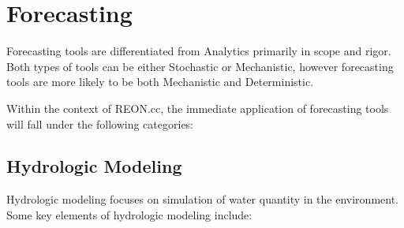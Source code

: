 \documentclass[letterpaper,12pt,english]{sphinxmanual}
\begin{document}
\section{Forecasting}
\label{\detokenize{requirements/knowledge/forecasting:forecasting}}\label{\detokenize{requirements/knowledge/forecasting::doc}}
\sphinxAtStartPar
Forecasting tools are differentiated from Analytics primarily in scope and
rigor. Both types of tools can be either Stochastic or Mechanistic, however
forecasting tools are more likely to be both Mechanistic and Deterministic.

\sphinxAtStartPar
Within the context of REON.cc, the immediate application of forecasting tools will fall under the following categories:


\subsection{Hydrologic Modeling}
\label{\detokenize{requirements/knowledge/hydrologic:hydrologic-modeling}}\label{\detokenize{requirements/knowledge/hydrologic::doc}}
\sphinxAtStartPar
Hydrologic modeling focuses on simulation of water quantity in the environment. Some key elements of hydrologic modeling include:
\end{document}
